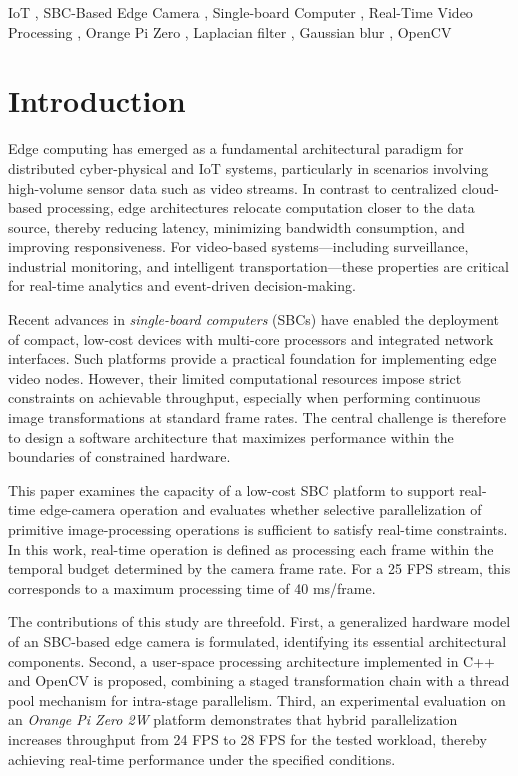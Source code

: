 \documentclass[
]{ceurart}
\begin{document}
\begin{keywords}
  IoT \sep
  SBC-Based Edge Camera \sep
  Single-board Computer \sep
  Real-Time Video Processing \sep
  Orange Pi Zero \sep
  Laplacian filter \sep
  Gaussian blur \sep
  OpenCV
\end{keywords}


\maketitle

\section{Introduction}

Edge computing has emerged as a fundamental architectural paradigm for distributed cyber-physical and IoT systems, particularly in scenarios involving high-volume sensor data such as video streams. In contrast to centralized cloud-based processing, edge architectures relocate computation closer to the data source, thereby reducing latency, minimizing bandwidth consumption, and improving responsiveness. For video-based systems—including surveillance, industrial monitoring, and intelligent transportation—these properties are critical for real-time analytics and event-driven decision-making.

Recent advances in \textit{single-board computers} (SBCs) have enabled the deployment of compact, low-cost devices with multi-core processors and integrated network interfaces. Such platforms provide a practical foundation for implementing edge video nodes. However, their limited computational resources impose strict constraints on achievable throughput, especially when performing continuous image transformations at standard frame rates. The central challenge is therefore to design a software architecture that maximizes performance within the boundaries of constrained hardware.

This paper examines the capacity of a low-cost SBC platform to support real-time edge-camera operation and evaluates whether selective parallelization of primitive image-processing operations is sufficient to satisfy real-time constraints. In this work, real-time operation is defined as processing each frame within the temporal budget determined by the camera frame rate. For a 25 FPS stream, this corresponds to a maximum processing time of 40 ms/frame.

The contributions of this study are threefold. First, a generalized hardware model of an SBC-based edge camera is formulated, identifying its essential architectural components. Second, a user-space processing architecture implemented in C++ and OpenCV is proposed, combining a staged transformation chain with a thread pool mechanism for intra-stage parallelism. Third, an experimental evaluation on an \textit{Orange Pi Zero 2W} platform demonstrates that hybrid parallelization increases throughput from 24 FPS to 28 FPS for the tested workload, thereby achieving real-time performance under the specified conditions.
\end{document}
